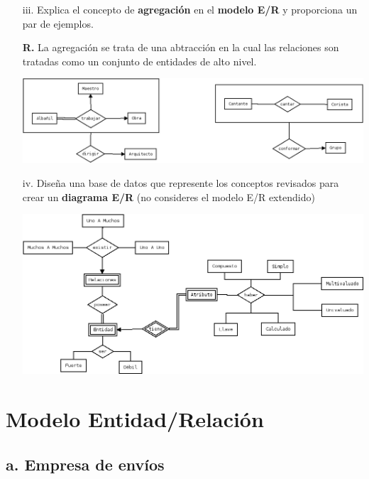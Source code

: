 \documentclass[12pt, letterpaper]{article}
\begin{document}
\begin{itemize}
\begin{itemize}
                      \end{itemize}
            \item[iii.] Explica el concepto de \textbf{agregación} en el 
                       \textbf{modelo E/R} y proporciona un par de ejemplos. \vspace{.1cm}

                       \textbf{R.} La agregación se trata de una abtracción
                                   en la cual las relaciones son tratadas como 
                                   un conjunto de entidades de alto nivel.\vspace{.2cm}

                        \includegraphics[scale=0.4]{agregacion.png}

            \item[iv.] Diseña una base de datos que represente los conceptos
                      revisados para crear un \textbf{diagrama E/R} (no 
                      consideres el modelo E/R extendido) \vspace{.2cm}

                      \includegraphics[scale=0.4]{modelo_eR.png}

        \end{itemize}

    \section{Modelo Entidad/Relación}

        \subsection*{a. Empresa de envíos}
\end{document}
